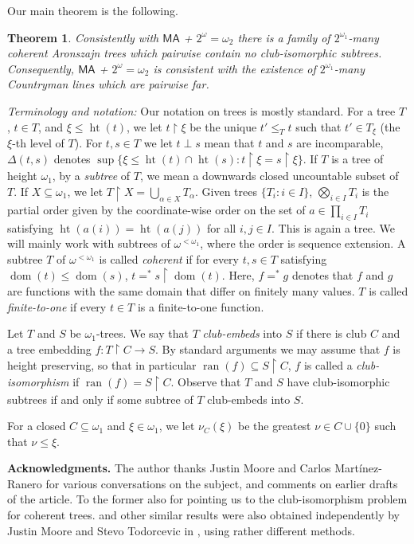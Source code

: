 \documentclass[a4paper,noamsfonts]{amsart}
\newtheorem{maintheorem}{Theorem}
\theoremstyle{definition}
\newcommand{\seb}{\subseteq}
\newcommand{\res}{\!\upharpoonright\!}
\newcommand{\MA}{\textsf{MA}}
\newcommand{\1}{\mathbbm{1}}
\DeclareMathOperator{\dom}{dom}
\DeclareMathOperator{\ran}{ran}
\DeclareMathOperator{\hht}{ht}
\begin{document}
Our main theorem is the following.

\begin{maintheorem}\label{thm:main}
  Consistently with $\MA$ + $2^{\omega} = \omega_{2}$ there is a family of
  $2^{\omega_{1}}$-many coherent Aronszajn trees
  which pairwise contain no club-isomorphic subtrees.
  Consequently,
  $\MA$ + $2^{\omega} = \omega_{2}$ is consistent with the existence of
  $2^{\omega_{1}}$-many Countryman lines which are pairwise far.
\end{maintheorem}

\noindent\emph{Terminology and notation:} Our notation on trees is mostly
standard. For a tree $T$, $t \in T$, and $\xi \le \hht(t)$,
we let $t\res \xi$ be the unique $t' \le_{T} t$ such that
$t' \in T_{\xi}$ (the $\xi$-th level of
$T$). For $t,s \in T$ we let $t \perp s$ mean
that $t$ and $s$ are incomparable,
$\Delta(t,s)$ denotes $\sup\{\xi \le \hht(t)\cap\hht(s)
: t\res \xi = s \res \xi\}$.
If $T$ is a tree of height $\omega_{1}$, by a \emph{subtree} of $T$,
we mean a downwards closed uncountable subset of $T$. If $X \seb \omega_{1}$,
we let $T \res X = \bigcup_{\alpha \in X}T_{\alpha}$.
Given
trees $\{T_{i} : i \in I\}$, $\bigotimes_{i \in I}T_{i}$ is the
partial order given by the coordinate-wise order on the set of $a \in
\prod_{i \in I}T_{i}$ satisfying $\hht(a(i)) = \hht(a(j))$ for all $i,j \in I$.
This is again a tree.
We will mainly work with subtrees of
$\omega^{<\omega_{1}}$, where the order is sequence extension. A subtree $T$ of
$\omega^{<\omega_{1}}$ is called \emph{coherent} if for every $t,s \in
T$ satisfying $\dom(t) \le \dom(s)$, $t =^{*} s\res\dom(t)$. Here,
$f =^{*} g$ denotes that $f$ and $g$ are functions with the same domain
that differ on finitely many values. $T$
is called \emph{finite-to-one} if every $t \in T$ is a finite-to-one
function.

Let $T$ and $S$ be $\omega_{1}$-trees. We say that $T$ \emph{club-embeds}
into $S$ if there is club $C$ and a tree embedding $f : T \res C \to S$.
By standard arguments we may assume that $f$ is height preserving,
so that in particular $\ran(f) \seb S \res C$, $f$ is called
a \emph{club-isomorphism} if $\ran(f) = S \res C$. Observe that $T$ and
$S$ have club-isomorphic subtrees if and only if some subtree of $T$
club-embeds into $S$.

For a closed $C \seb \omega_{1}$ and $\xi \in \omega_{1}$,
we let $\nu_{C}(\xi)$ be the greatest
$\nu \in C \cup \{0\}$ such that $\nu \le \xi$.

\bigskip
\noindent \textbf{Acknowledgments.}
The author thanks Justin Moore and Carlos Martínez-Ranero for various
conversations on the subject, and comments on earlier drafts of the
article. To the former also for pointing us to the club-isomorphism
problem for coherent trees.  and other similar results
were also obtained independently by Justin Moore and Stevo Todorcevic
in \cite{MooreTodorcevic}, using rather different methods.
\end{document}
